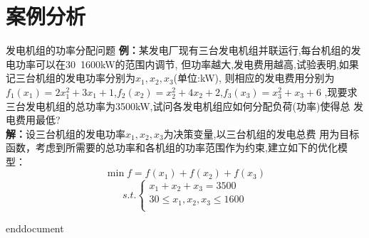 \section{案例分析}
\begin{exbox}{发电机组的功率分配问题}{}
\textbf{例：}某发电厂现有三台发电机组并联运行,每台机组的发电功率可以在30~1600kW的范围内调节,
但功率越大,发电费用越高,试验表明,如果记三台机组的发电功率分别为$x_1,x_2,x_3$(单位:kW),
则相应的发电费用分别为$f_1(x_1)=2x_1^2+3x_1+1$,$f_2(x_2)=x_2^2+4x_2+2$,$f_3(x_3)=x_3^2+x_3+6$
,现要求三台发电机组的总功率为3500kW,试问各发电机组应如何分配负荷(功率)使得总
发电费用最低?
\\
\textbf{解：}设三台机组的发电功率$x_1,x_2,x_3$为决策变量,以三台机组的发电总费
用为目标函数，考虑到所需要的总功率和各机组的功率范围作为约束,建立如下的优化模型：
$$
\min f=f(x_1)+f(x_2)+f(x_3)
$$
$$
s.t.
\begin{cases}
    x_1+x_2+x_3=3500 \\
    30 \leq x_1,x_2,x_3 \leq 1600 \\
\end{cases}
$$
\end{exbox}
\ifx\allfiles\undefined
	
	
	end{document}
	\else
	\fi